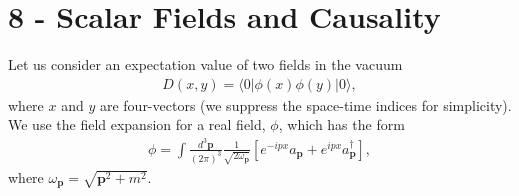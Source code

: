 \documentclass[working, oneside]{../../Preambles/tuftebook}
\begin{document}
\let\cleardoublepage\clearpage
\thispagestyle{fancy}
\chapter{8 - Scalar Fields and Causality}

Let us consider an expectation value of two fields in the vacuum
\begin{align*}
D(x, y) = \langle 0 | \phi(x) \phi(y) | 0 \rangle,
\end{align*}
where $x$ and $y$ are four-vectors (we suppress the space-time indices for simplicity). We use the field expansion for a real field, $\phi$, which has the form
\begin{align*}
\phi = \int \frac{d^3 \mathbf{p}}{(2\pi)^3} \frac{1}{\sqrt{2 \omega_\mathbf{p}}} \left[ e^{-ipx} a_\mathbf{p} + e^{ipx} a_\mathbf{p}^\dagger \right],
\end{align*}
where $\omega_\mathbf{p} = \sqrt{\mathbf{p}^2 + m^2}$.
\end{document}
